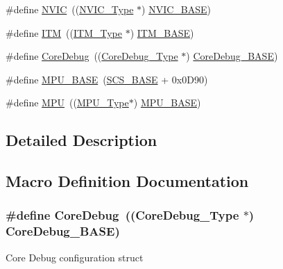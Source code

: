 \begin{DoxyCompactItemize}
\item 
\#define \hyperlink{group__CMSIS__CM3__core__register_gac8e97e8ce56ae9f57da1363a937f8a17}{N\+V\+IC}~((\hyperlink{structNVIC__Type}{N\+V\+I\+C\+\_\+\+Type} $\ast$)          \hyperlink{group__CMSIS__CM3__core__register_gaa0288691785a5f868238e0468b39523d}{N\+V\+I\+C\+\_\+\+B\+A\+SE})
\item 
\#define \hyperlink{group__CMSIS__CM3__core__register_gabae7cdf882def602cb787bb039ff6a43}{I\+TM}~((\hyperlink{structITM__Type}{I\+T\+M\+\_\+\+Type} $\ast$)           \hyperlink{group__CMSIS__CM3__core__register_gadd76251e412a195ec0a8f47227a8359e}{I\+T\+M\+\_\+\+B\+A\+SE})
\item 
\#define \hyperlink{group__CMSIS__CM3__core__register_gab6e30a2b802d9021619dbb0be7f5d63d}{Core\+Debug}~((\hyperlink{structCoreDebug__Type}{Core\+Debug\+\_\+\+Type} $\ast$)     \hyperlink{group__CMSIS__CM3__core__register_ga680604dbcda9e9b31a1639fcffe5230b}{Core\+Debug\+\_\+\+B\+A\+SE})
\item 
\#define \hyperlink{group__CMSIS__CM3__core__register_gaa0805ccd2bc4e42d63adb0618d2af571}{M\+P\+U\+\_\+\+B\+A\+SE}~(\hyperlink{group__CMSIS__CM3__core__register_ga3c14ed93192c8d9143322bbf77ebf770}{S\+C\+S\+\_\+\+B\+A\+SE} +  0x0\+D90)
\item 
\#define \hyperlink{group__CMSIS__CM3__core__register_gaad8182e72fe5037a6ba1eb65a1554e0b}{M\+PU}~((\hyperlink{structMPU__Type}{M\+P\+U\+\_\+\+Type}$\ast$)            \hyperlink{group__CMSIS__CM3__core__register_gaa0805ccd2bc4e42d63adb0618d2af571}{M\+P\+U\+\_\+\+B\+A\+SE})
\end{DoxyCompactItemize}


\subsection{Detailed Description}


\subsection{Macro Definition Documentation}
\subsubsection[{\texorpdfstring{Core\+Debug}{CoreDebug}}]{\setlength{\rightskip}{0pt plus 5cm}\#define Core\+Debug~(({\bf Core\+Debug\+\_\+\+Type} $\ast$)     {\bf Core\+Debug\+\_\+\+B\+A\+SE})}\hypertarget{group__CMSIS__CM3__core__register_gab6e30a2b802d9021619dbb0be7f5d63d}{}\label{group__CMSIS__CM3__core__register_gab6e30a2b802d9021619dbb0be7f5d63d}
Core Debug configuration struct 
